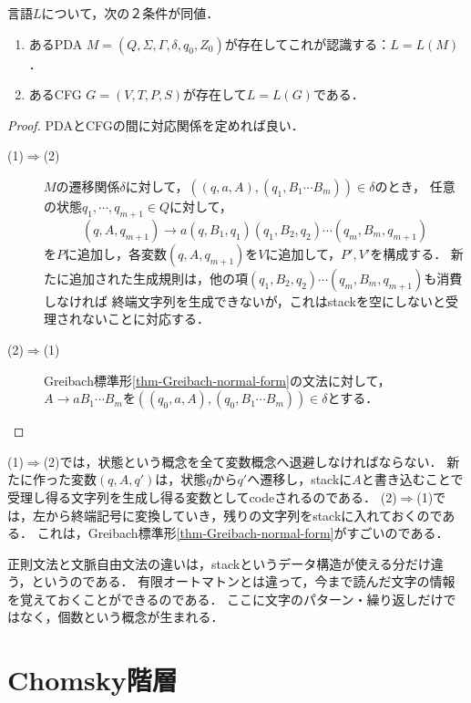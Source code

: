 \begin{theorem}\label{thm-CFL-PDA}
    言語$L$について，次の２条件が同値．
    \begin{enumerate}
        \item あるPDA $M=(Q,\Sigma,\Gamma,\delta,q_0,Z_0)$が存在してこれが認識する：$L=L(M)$．
        \item あるCFG $G=(V,T,P,S)$が存在して$L=L(G)$である．
    \end{enumerate}
\end{theorem}
\begin{proof}
    PDAとCFGの間に対応関係を定めれば良い．
    \begin{description}
        \item[(1)$\Rightarrow$(2)] 
        $M$の遷移関係$\delta$に対して，$((q,a,A),(q_1,B_1\cdots B_m))\in\delta$のとき，
        任意の状態$q_1,\cdots,q_{m+1}\in Q$に対して，
        \[(q,A,q_{m+1})\to a(q,B_1,q_1)(q_1,B_2,q_2)\cdots(q_m,B_m,q_{m+1})\]
        を$P$に追加し，各変数$(q,A,q_{m+1})$を$V$に追加して，$P',V'$を構成する．
        新たに追加された生成規則は，他の項$(q_1,B_2,q_2)\cdots(q_m,B_m,q_{m+1})$も消費しなければ
        終端文字列を生成できないが，これはstackを空にしないと受理されないことに対応する．
        \item[(2)$\Rightarrow$(1)] 
        Greibach標準形\ref{thm-Greibach-normal-form}の文法に対して，
        $A\to aB_1\cdots B_m$を$((q_0,a,A),(q_0,B_1\cdots B_m))\in\delta$とする．
    \end{description}
\end{proof}
\begin{remarks}[Greibach標準形が全て]
    (1)$\Rightarrow$(2)では，状態という概念を全て変数概念へ退避しなければならない．
    新たに作った変数$(q,A,q')$は，状態$q$から$q'$へ遷移し，stackに$A$と書き込むことで受理し得る文字列を生成し得る変数としてcodeされるのである．
    (2)$\Rightarrow$(1)では，左から終端記号に変換していき，残りの文字列をstackに入れておくのである．
    これは，Greibach標準形\ref{thm-Greibach-normal-form}がすごいのである．
\end{remarks}

\begin{screen}
    正則文法と文脈自由文法の違いは，stackというデータ構造が使える分だけ違う，というのである．
    有限オートマトンとは違って，今まで読んだ文字の情報を覚えておくことができるのである．
    ここに文字のパターン・繰り返しだけではなく，個数という概念が生まれる．
\end{screen}

\section{Chomsky階層}

